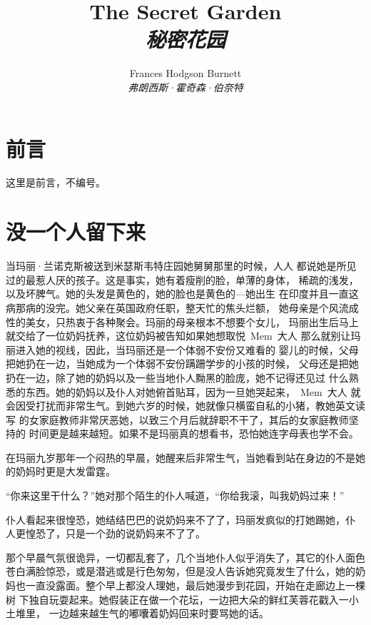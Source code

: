 \documentclass[winfonts,UTF8,cs4size,a4paper,hyperref,fancyhdr,fntef]{ctexbook}
\begin{document}
\title{The Secret Garden\\ \emph{秘密花园}}
\author{Frances Hodgson Burnett\\ \emph{弗朗西斯·霍奇森·伯奈特}}

\maketitle
\thispagestyle{empty}
\frontmatter
\tableofcontents
\clearpage


\chapter*{前言}

这里是前言，不编号。

\mainmatter
\chapter{没一个人留下来}

当玛丽·兰诺克斯被送到米瑟斯韦特庄园她舅舅那里的时候，人人
都说她是所见过的最惹人厌的孩子。这是事实，她有着瘦削的脸，单薄的身体，
稀疏的浅发，以及坏脾气。她的头发是黄色的，她的脸也是黄色的---她出生
在印度并且一直这病那病的没完。她父亲在英国政府任职，整天忙的焦头烂额，
她母亲是个风流成性的美女，只热衷于各种聚会。玛丽的母亲根本不想要个女儿，
玛丽出生后马上就交给了一位奶妈抚养，这位奶妈被告知如果她想取悦~Mem~大人
那么就别让玛丽进入她的视线，因此，当玛丽还是一个体弱不安份又难看的
婴儿的时候，父母把她扔在一边，当她成为一个体弱不安份蹒跚学步的小孩的时候，
父母还是把她扔在一边，除了她的奶妈以及一些当地仆人黝黑的脸庞，她不记得还见过
什么熟悉的东西。她的奶妈以及仆人对她俯首贴耳，因为一旦她哭起来，~Mem~大人
就会因受打扰而非常生气。到她六岁的时候，她就像只横蛮自私的小猪，教她英文读写
的女家庭教师非常厌恶她，以致三个月后就辞职不干了，其后的女家庭教师坚持的
时间更是越来越短。如果不是玛丽真的想看书，恐怕她连字母表也学不会。

在玛丽九岁那年一个闷热的早晨，她醒来后非常生气，当她看到站在身边的不是她
的奶妈时更是大发雷霆。

``你来这里干什么？''她对那个陌生的仆人喊道，``你给我滚，叫我奶妈过来！''

仆人看起来很惶恐，她结结巴巴的说奶妈来不了了，玛丽发疯似的打她踢她，仆
人更惶恐了，只是一个劲的说奶妈来不了了。

那个早晨气氛很诡异，一切都乱套了，几个当地仆人似乎消失了，其它的仆人面色
苍白满脸惊恐，或是潜逃或是行色匆匆，但是没人告诉她究竟发生了什么，她的奶
妈也一直没露面。整个早上都没人理她，最后她漫步到花园，开始在走廊边上一棵树
下独自玩耍起来。她假装正在做一个花坛，一边把大朵的鲜红芙蓉花戳入一小土堆里，
一边越来越生气的嘟囔着奶妈回来时要骂她的话。
\end{document}
